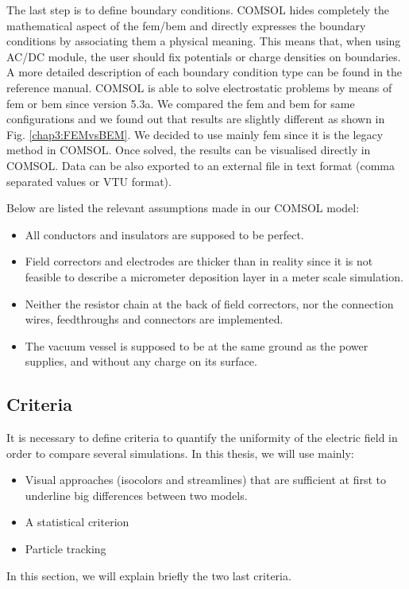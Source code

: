 \begin{refsection}
  The last step is to define boundary conditions. COMSOL hides completely the mathematical aspect of the \acrshort{fem}/\acrshort{bem} and directly expresses the boundary conditions by associating them a physical meaning. This means that, when using AC/DC module, the user should fix potentials or charge densities on boundaries. A more detailed description of each boundary condition type can be found in the reference manual. COMSOL is able to solve electrostatic problems by means of \acrshort{fem} or \acrshort{bem} since version 5.3a. We compared the \acrshort{fem} and \acrshort{bem} for same configurations and we found out that results are slightly different as shown in Fig. \ref{chap3:FEMvsBEM}. We decided to use mainly \acrshort{fem} since it is the legacy method in COMSOL.
  Once solved, the results can be visualised directly in COMSOL. Data can be also exported to an external file in text format (comma separated values or VTU format).

  Below are listed the relevant assumptions made in our COMSOL model:
  \begin{itemize}
    \item All conductors and insulators are supposed to be perfect.
    \item Field correctors and electrodes are thicker than in reality since it is not feasible to describe a micrometer deposition layer in a meter scale simulation.
    \item Neither the resistor chain at the back of field correctors, nor the connection wires, feedthroughs and connectors are implemented.
    \item The vacuum vessel is supposed to be at the same ground as the power supplies, and without any charge on its surface.
  \end{itemize}

  \subsection{Criteria}
  \label{chap3:sec:criteria}
  It is necessary to define criteria to quantify the uniformity of the electric field in order to compare several simulations. In this thesis, we will use mainly:
  \begin{itemize}
    \item Visual approaches (isocolors and streamlines) that are sufficient at first to underline big differences between two models.
    \item A statistical criterion
    \item Particle tracking
  \end{itemize}
  In this section, we will explain briefly the two last criteria.


\end{refsection}

